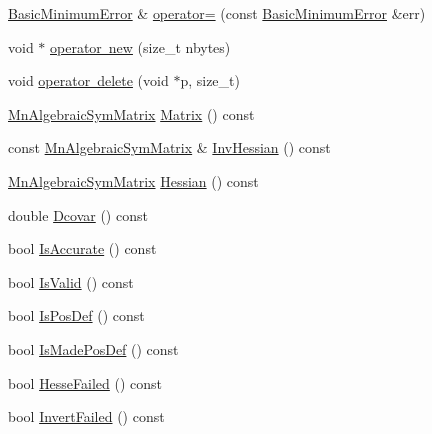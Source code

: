 \begin{DoxyCompactItemize}
\item 
\mbox{\hyperlink{classROOT_1_1Minuit2_1_1BasicMinimumError}{Basic\+Minimum\+Error}} \& \mbox{\hyperlink{classROOT_1_1Minuit2_1_1BasicMinimumError_a83389971838f6e91a3b632604c227571}{operator=}} (const \mbox{\hyperlink{classROOT_1_1Minuit2_1_1BasicMinimumError}{Basic\+Minimum\+Error}} \&err)
\item 
void $\ast$ \mbox{\hyperlink{classROOT_1_1Minuit2_1_1BasicMinimumError_a722b14848c4cb4144f4ba7cdf90e5ef3}{operator new}} (size\+\_\+t nbytes)
\item 
void \mbox{\hyperlink{classROOT_1_1Minuit2_1_1BasicMinimumError_ae64544fb94b090a6a9117243c5fa9f93}{operator delete}} (void $\ast$p, size\+\_\+t)
\item 
\mbox{\hyperlink{namespaceROOT_1_1Minuit2_a9e74ad97f5537a2e80e52b04d98ecc6e}{Mn\+Algebraic\+Sym\+Matrix}} \mbox{\hyperlink{classROOT_1_1Minuit2_1_1BasicMinimumError_aee3316ac5c67df009fb8116b8ca999c4}{Matrix}} () const
\item 
const \mbox{\hyperlink{namespaceROOT_1_1Minuit2_a9e74ad97f5537a2e80e52b04d98ecc6e}{Mn\+Algebraic\+Sym\+Matrix}} \& \mbox{\hyperlink{classROOT_1_1Minuit2_1_1BasicMinimumError_ac488e980cb8e194bc654a8bad791d60d}{Inv\+Hessian}} () const
\item 
\mbox{\hyperlink{namespaceROOT_1_1Minuit2_a9e74ad97f5537a2e80e52b04d98ecc6e}{Mn\+Algebraic\+Sym\+Matrix}} \mbox{\hyperlink{classROOT_1_1Minuit2_1_1BasicMinimumError_a9d247706dc8b8a83d7adf2912eabe91f}{Hessian}} () const
\item 
double \mbox{\hyperlink{classROOT_1_1Minuit2_1_1BasicMinimumError_a9b16fca9ff741ec0959702a5d9dd736e}{Dcovar}} () const
\item 
bool \mbox{\hyperlink{classROOT_1_1Minuit2_1_1BasicMinimumError_ab8a6e5ff16227d3fdaa4ae83fc96edb5}{Is\+Accurate}} () const
\item 
bool \mbox{\hyperlink{classROOT_1_1Minuit2_1_1BasicMinimumError_aa029ef7de1ad9ab763d5731bdea4efbe}{Is\+Valid}} () const
\item 
bool \mbox{\hyperlink{classROOT_1_1Minuit2_1_1BasicMinimumError_a8a7821d2ac317e0dc6a904791de04950}{Is\+Pos\+Def}} () const
\item 
bool \mbox{\hyperlink{classROOT_1_1Minuit2_1_1BasicMinimumError_aa72c861b5feb089fc1418fe282790ec0}{Is\+Made\+Pos\+Def}} () const
\item 
bool \mbox{\hyperlink{classROOT_1_1Minuit2_1_1BasicMinimumError_a10d2ddaff7b0763e5a710890b045b3e7}{Hesse\+Failed}} () const
\item 
bool \mbox{\hyperlink{classROOT_1_1Minuit2_1_1BasicMinimumError_ac93ba151cf6ea3bbc330dd715764de2f}{Invert\+Failed}} () const

\end{DoxyCompactItemize}
